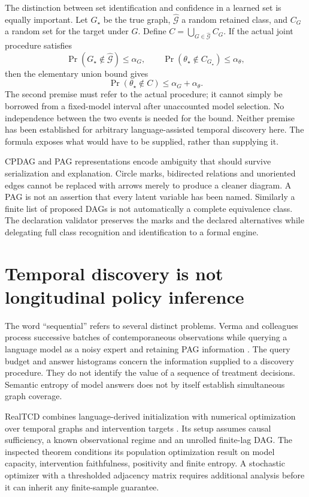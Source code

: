 The distinction between set identification and confidence in a learned set is
equally important. Let $G_\star$ be the true graph, $\widehat{\mathcal G}$ a
random retained class, and $C_G$ a random set for the target under $G$. Define
$C=\bigcup_{G\in\widehat{\mathcal G}}C_G$. If the actual joint procedure
satisfies
\[
 \Pr(G_\star\notin\widehat{\mathcal G})\le\alpha_G,
 \qquad
 \Pr(\theta_\star\notin C_{G_\star})\le\alpha_\theta,
\]
then the elementary union bound gives
\begin{equation}
 \Pr(\theta_\star\notin C)\le\alpha_G+\alpha_\theta.
 \label{eq:la03-coverage-decomposition}
\end{equation}
The second premise must refer to the actual procedure; it cannot simply be
borrowed from a fixed-model interval after unaccounted model selection. No
independence between the two events is needed for the bound. Neither premise
has been established for arbitrary language-assisted temporal discovery here.
The formula exposes what would have to be supplied, rather than supplying it.

CPDAG and PAG representations encode ambiguity that should survive
serialization and explanation. Circle marks, bidirected relations and
unoriented edges cannot be replaced with arrows merely to produce a cleaner
diagram. A PAG is not an assertion that every latent variable has been named.
Similarly a finite list of proposed DAGs is not automatically a complete
equivalence class. The declaration validator preserves the marks and the
declared alternatives while delegating full class recognition and
identification to a formal engine.

\section{Temporal discovery is not longitudinal policy inference}

The word ``sequential'' refers to several distinct problems. Verma and
colleagues process successive batches of contemporaneous observations while
querying a language model as a noisy expert and retaining PAG information
\cite{v12_la_2506_16234}. The query budget and answer histograms concern
the information supplied to a discovery procedure. They do not identify the
value of a sequence of treatment decisions. Semantic entropy of model answers
does not by itself establish simultaneous graph coverage.

RealTCD combines language-derived initialization with numerical optimization
over temporal graphs and intervention targets
\cite{v12_la_2404_14786}. Its setup assumes causal sufficiency, a known
observational regime and an unrolled finite-lag DAG. The inspected theorem
conditions its population optimization result on model capacity, intervention
faithfulness, positivity and finite entropy. A stochastic optimizer with a
thresholded adjacency matrix requires additional analysis before it can inherit
any finite-sample guarantee.

